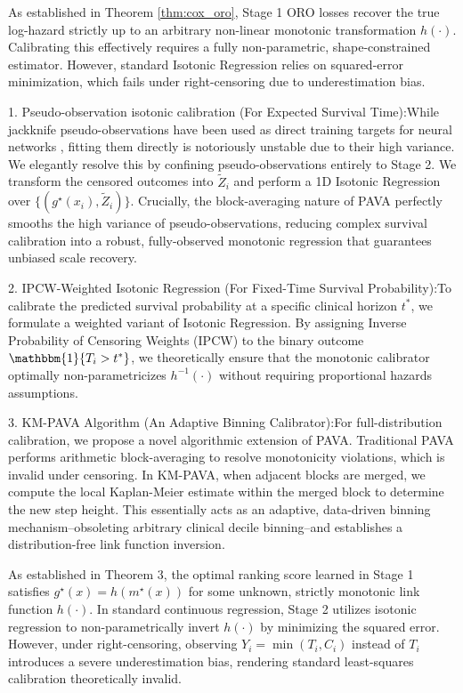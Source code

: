 \documentclass[11pt]{article}
\theoremstyle{plain}
\theoremstyle{plain}
\theoremstyle{plain}
\theoremstyle{plain}
\theoremstyle{plain}
\theoremstyle{plain}
\theoremstyle{plain}
\begin{document}
{As established in Theorem \ref{thm:cox_oro}, Stage 1 ORO losses recover the true log-hazard strictly up to an arbitrary non-linear monotonic transformation $h(\cdot)$. Calibrating this effectively requires a fully non-parametric, shape-constrained estimator. However, standard Isotonic Regression relies on squared-error minimization, which fails under right-censoring due to underestimation bias. 

1. Pseudo-observation isotonic calibration (For Expected Survival Time):While jackknife pseudo-observations \cite{andersen2010pseudo} have been used as direct training targets for neural networks \cite{zhao2021dnnsurv}, fitting them directly is notoriously unstable due to their high variance. We elegantly resolve this by confining pseudo-observations entirely to Stage 2. We transform the censored outcomes into $\tilde{Z}_i$ and perform a 1D Isotonic Regression over $\{(g^\star(x_i), \tilde{Z}_i)\}$. Crucially, the block-averaging nature of PAVA perfectly smooths the high variance of pseudo-observations, reducing complex survival calibration into a robust, fully-observed monotonic regression that guarantees unbiased scale recovery.

2. IPCW-Weighted Isotonic Regression (For Fixed-Time Survival Probability):To calibrate the predicted survival probability at a specific clinical horizon $t^*$, we formulate a weighted variant of Isotonic Regression. By assigning Inverse Probability of Censoring Weights (IPCW) \cite{graf1999assessment} to the binary outcome $\mathbbm{1}\{T_i > t^*\}$, we theoretically ensure that the monotonic calibrator optimally non-parametricizes $h^{-1}(\cdot)$ without requiring proportional hazards assumptions.


3. KM-PAVA Algorithm (An Adaptive Binning Calibrator):For full-distribution calibration, we propose a novel algorithmic extension of PAVA. Traditional PAVA performs arithmetic block-averaging to resolve monotonicity violations, which is invalid under censoring. In KM-PAVA, when adjacent blocks are merged, we compute the local Kaplan-Meier estimate within the merged block to determine the new step height. This essentially acts as an adaptive, data-driven binning mechanism--obsoleting arbitrary clinical decile binning--and establishes a distribution-free link function inversion.

As established in Theorem 3, the optimal ranking score learned in Stage 1 satisfies $g^\star(x) = h(m^\star(x))$ for some unknown, strictly monotonic link function $h(\cdot)$. In standard continuous regression, Stage 2 utilizes isotonic regression to non-parametrically invert $h(\cdot)$ by minimizing the squared error. However, under right-censoring, observing $Y_i = \min(T_i, C_i)$ instead of $T_i$ introduces a severe underestimation bias, rendering standard least-squares calibration theoretically invalid. 

}
\end{document}
